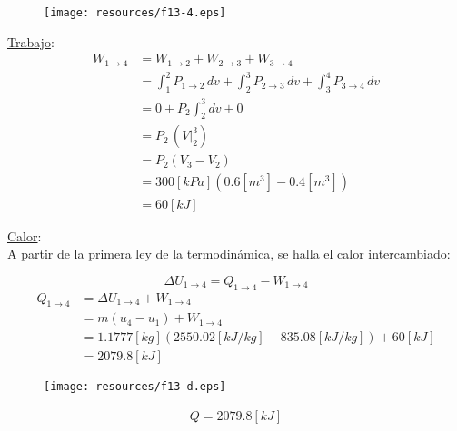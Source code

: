 \documentclass[letter,11pt]{article}
\begin{document}
\begin{enumerate}
\begin{figure}[H]
\centering
\texttt{[image: resources/f13-4.eps]}
\end{figure}

\underline{Trabajo}: \\
\begin{equation*}
    \begin{split}
    W_{1\rightarrow 4} &= W_{1\rightarrow 2} + W_{2\rightarrow 3}
                          + W_{3\rightarrow 4} \\
                       &= \int_1^2 P_{1\rightarrow 2}\,dv
                          + \int_2^3 P_{2\rightarrow 3}\,dv
                          + \int_3^4 P_{3\rightarrow 4}\,dv \\
                       &= 0 + P_2 \int_2^3 dv + 0 \\
                       &= P_2\,(V\Biggr|_2^3) \\
                       &= P_2(V_3-V_2) \\
                       &= 300[kPa](0.6[m^3]-0.4[m^3]) \\
                       &= 60[kJ]
    \end{split}
\end{equation*}

\underline{Calor}: \\
A partir de la primera ley de la termodinámica, se halla el calor intercambiado:

\begin{equation*}
    \Delta U_{1\rightarrow 4} = Q_{1\rightarrow 4} - W_{1\rightarrow 4}
\end{equation*}
\begin{equation*}
    \begin{split}
        Q_{1\rightarrow 4} &= \Delta U_{1\rightarrow 4} + W_{1\rightarrow 4} \\
                           &= m(u_4 - u_1) + W_{1\rightarrow 4} \\
                           &= 1.1777[kg](2550.02[kJ/kg]-835.08[kJ/kg])+60[kJ] \\
                           &= 2079.8[kJ]
    \end{split}
\end{equation*}

\begin{figure}[H]
\centering
\texttt{[image: resources/f13-d.eps]}
\end{figure}

\begin{equation*}
\boxed{
    \begin{array}{l}
        Q = 2079.8[kJ]
    \end{array}
}
\end{equation*}

\end{enumerate}
\end{document}
